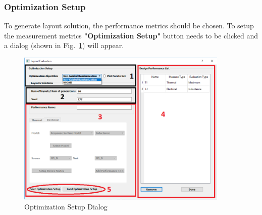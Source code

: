 \documentclass[11pt]{article}
\begin{document}
\subsubsection{Optimization Setup}
\label{sec-2-6-4}
To generate layout solution, the performance metrics should be chosen. To setup the measurement metrics \textbf{"Optimization Setup"} button needs to be clicked and a dialog (shown in Fig.~\ref{opt_setup}) will appear.
\begin{figure}[H]
\centering

\includegraphics[width=0.9\textwidth]{./figs/optimization_setup.PNG}
\caption{Optimization Setup Dialog}
\label{opt_setup}
\end{figure}
\end{document}
